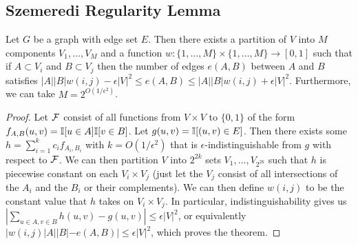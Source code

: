 \documentclass[11pt]{article}
\begin{document}
%
\subsection{Szemeredi Regularity Lemma}
\begin{theorem}[Szemeredi]
Let $G$ be a graph with edge set $E$. Then there exists a partition of $V$ into $M$ components $V_1,\ldots,V_M$ and a 
function $w : \{1,\ldots,M\} \times \{1,\ldots,M\} \to [0,1]$ such that if $A \subset V_i$ and $B \subset V_j$ then 
the number of edges $e(A,B)$ between $A$ and $B$ satisfies $|A||B|w(i,j)-\epsilon|V|^2 \leq e(A,B) \leq |A||B|w(i,j) + \epsilon|V|^2$. Furthermore, 
we can take $M = 2^{O(1/\epsilon^2)}$.
\end{theorem}

\begin{proof}
Let $\mathcal{F}$ consist of all functions from $V \times V$ to $\{0,1\}$ of the form $f_{A,B}(u,v) = \mathbb{I}[u \in A] \mathbb{I}[v \in B]$. Let $g(u,v) = \mathbb{I}[(u,v) \in E]$. 
Then there exists some $h = \sum_{i=1}^k c_i f_{A_i,B_i}$ with $k = O(1/\epsilon^2)$ that is $\epsilon$-indistinguishable from $g$ with respect to $\mathcal{F}$. 
We can then partition $V$ into $2^{2k}$ sets $V_1,\ldots,V_{2^{2k}}$ such that $h$ is piecewise constant on each $V_i \times V_j$ (just let the $V_j$ consist of all 
intersections of the $A_i$ and the $B_i$ or their complements). We can then define $w(i,j)$ to be the constant value that $h$ takes on $V_i \times V_j$.
In particular, indistinguishability gives us $|\sum_{u \in A, v \in B} h(u,v) - g(u,v)| \leq \epsilon |V|^2$, 
or equivalently $|w(i,j)|A||B|-e(A,B)| \leq \epsilon |V|^2$, which proves the theorem.
\end{proof}
\end{document}
